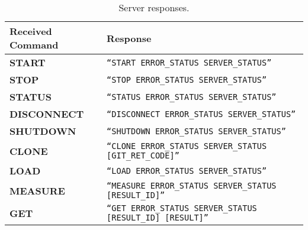 \newcommand{\specialcell}[2][c]{%
  \begin{tabular}[#1]{@{}K@{}}#2\end{tabular}}


\begin{table}[htpb]
    \centering
    \tiny
    \begin{tabular}{@{}TK@{}}
        \toprule
        {\bf Received Command} & {\bf Response} \\ \midrule
        {\tiny \bf START} &
        {\tiny \tt ``START ERROR\_STATUS SERVER\_STATUS''} \\ \midrule
        {\tiny \bf STOP} &
        {\tiny \tt ``STOP ERROR\_STATUS SERVER\_STATUS''} \\ \midrule
        {\tiny \bf STATUS} &
        {\tiny \tt ``STATUS ERROR\_STATUS SERVER\_STATUS''} \\ \midrule
        {\tiny \bf DISCONNECT} &
        {\tiny \tt ``DISCONNECT ERROR\_STATUS SERVER\_STATUS''} \\ \midrule
        {\tiny \bf SHUTDOWN} &
        {\tiny \tt ``SHUTDOWN ERROR\_STATUS SERVER\_STATUS''} \\ \midrule
        {\tiny \bf CLONE} &
        {\tiny \tt ``CLONE ERROR\_STATUS SERVER\_STATUS [GIT\_RET\_CODE]''} \\ \midrule
        {\tiny \bf LOAD} &
        {\tiny \tt ``LOAD ERROR\_STATUS SERVER\_STATUS''} \\ \midrule
        {\tiny \bf MEASURE} &
        {\tiny \tt ``MEASURE ERROR\_STATUS SERVER\_STATUS [RESULT\_ID]''} \\ \midrule
        {\tiny \bf GET} &
        {\tiny \tt ``GET ERROR\_STATUS SERVER\_STATUS [RESULT\_ID] [RESULT]''} \\ \bottomrule
    \end{tabular}
    \caption{Server responses.}
    \label{tab:protocol-responses}
\end{table}
